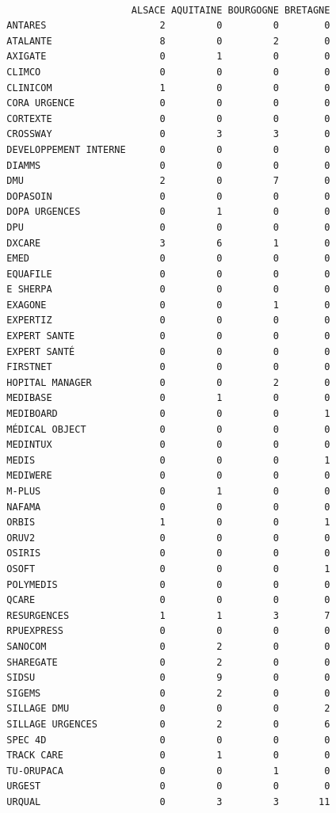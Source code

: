 \documentclass[]{article}
\begin{document}
\begin{verbatim}
                       
                        ALSACE AQUITAINE BOURGOGNE BRETAGNE
  ANTARES                    2         0         0        0
  ATALANTE                   8         0         2        0
  AXIGATE                    0         1         0        0
  CLIMCO                     0         0         0        0
  CLINICOM                   1         0         0        0
  CORA URGENCE               0         0         0        0
  CORTEXTE                   0         0         0        0
  CROSSWAY                   0         3         3        0
  DEVELOPPEMENT INTERNE      0         0         0        0
  DIAMMS                     0         0         0        0
  DMU                        2         0         7        0
  DOPASOIN                   0         0         0        0
  DOPA URGENCES              0         1         0        0
  DPU                        0         0         0        0
  DXCARE                     3         6         1        0
  EMED                       0         0         0        0
  EQUAFILE                   0         0         0        0
  E SHERPA                   0         0         0        0
  EXAGONE                    0         0         1        0
  EXPERTIZ                   0         0         0        0
  EXPERT SANTE               0         0         0        0
  EXPERT SANTÉ               0         0         0        0
  FIRSTNET                   0         0         0        0
  HOPITAL MANAGER            0         0         2        0
  MEDIBASE                   0         1         0        0
  MEDIBOARD                  0         0         0        1
  MÉDICAL OBJECT             0         0         0        0
  MEDINTUX                   0         0         0        0
  MEDIS                      0         0         0        1
  MEDIWERE                   0         0         0        0
  M-PLUS                     0         1         0        0
  NAFAMA                     0         0         0        0
  ORBIS                      1         0         0        1
  ORUV2                      0         0         0        0
  OSIRIS                     0         0         0        0
  OSOFT                      0         0         0        1
  POLYMEDIS                  0         0         0        0
  QCARE                      0         0         0        0
  RESURGENCES                1         1         3        7
  RPUEXPRESS                 0         0         0        0
  SANOCOM                    0         2         0        0
  SHAREGATE                  0         2         0        0
  SIDSU                      0         9         0        0
  SIGEMS                     0         2         0        0
  SILLAGE DMU                0         0         0        2
  SILLAGE URGENCES           0         2         0        6
  SPEC 4D                    0         0         0        0
  TRACK CARE                 0         1         0        0
  TU-ORUPACA                 0         0         1        0
  URGEST                     0         0         0        0
  URQUAL                     0         3         3       11
                       

\end{verbatim}
\end{document}
